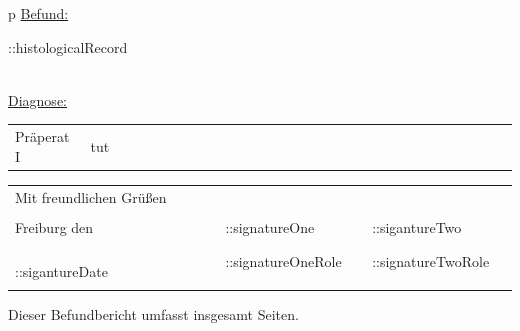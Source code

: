 \documentclass{scrreprt}
\begin{document}
\begin{center}
\setlength{\tabcolsep}{0em}
\begin{longtable}{p{\linewidth}}
	\large \underline{ Befund: }\\*
	\begin{addmargin}{0.2cm}
		\normalsize ::histologicalRecord
	\end{addmargin}\\
	\large \underline{ Diagnose: }\\*
	\begin{addmargin}{0.2cm}
		\begin{tabular}{p{0.15\linewidth}p{0.85\linewidth}}
			Präperat I & tut \\
		\end{tabular}
	\end{addmargin} 
\end{longtable}
\end{center}

\begin{center}
\begin{tabular}{p{0.15\linewidth}p{0.25\linewidth}p{0.3\linewidth}p{0.3\linewidth}}
	\multicolumn{4}{l}{Mit freundlichen Grüßen} \\\\
	Freiburg den & & ::signatureOne & ::sigantureTwo \\
	~~ ::sigantureDate & ~ & ::signatureOneRole & ::signatureTwoRole\\\\

\end{tabular}
\end{center}
     {	Dieser Befundbericht umfasst insgesamt \pageref{LastPage} Seiten. }
     {~	}
     
	
\end{document}
